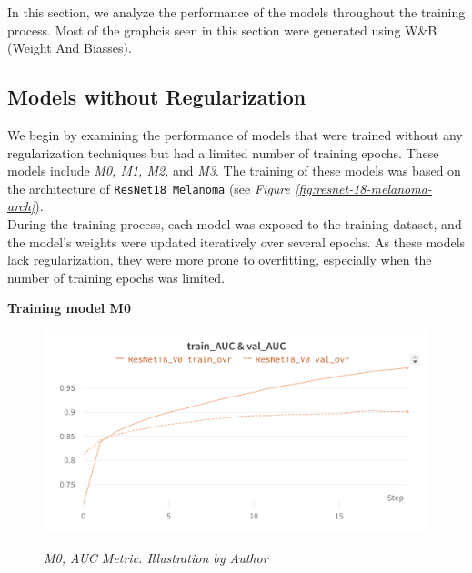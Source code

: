 In this section, we analyze the performance of the models throughout the training process.
Most of the graphcis seen in this section were generated using W\&B (Weight And Biasses).\\

\subsection{Models without Regularization}
We begin by examining the performance of models that were trained without any
regularization techniques but had a limited number of training epochs. These models include
\textit{M0, M1, M2,} and \textit{M3}.
The training of these models was based on the architecture of {\tt ResNet18\_Melanoma} (see \textit{Figure \ref{fig:resnet-18-melanoma-arch}}). \\

During the training process,
each model was exposed to the training dataset, and the model's weights were updated iteratively over several epochs.
As these models lack regularization, they were more prone to overfitting, especially when the number of training epochs was limited.

\vspace{0.5cm}
\textbf{Training model M0}

\begin{figure}[H]
\centering
    \includegraphics[width=\textwidth]{imatges/results/ResNet18V0AUC.png}
\caption[M0, AUC Metric]{\textit{M0, AUC Metric. Illustration by Author}}
{\label{fig:flux_development}}
\end{figure}

\newpage

